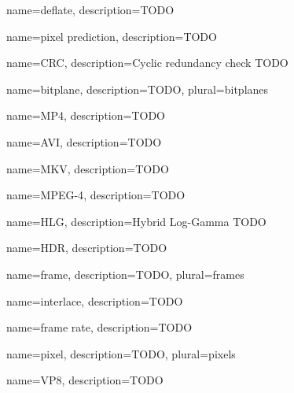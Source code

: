 {
	name={deflate},
	description={TODO}
}

{
	name={pixel prediction},
	description={TODO}
}

{
	name={CRC},
	description={Cyclic redundancy check TODO}
}

{
	name={bitplane},
	description={TODO},
	plural={bitplanes}
}

{
	name={MP4},
	description={TODO}
}

{
	name={AVI},
	description={TODO}
}

{
	name={MKV},
	description={TODO}
}

{
	name={MPEG-4},
	description={TODO}
}

{
	name={HLG},
	description={Hybrid Log-Gamma TODO}
}

{
	name={HDR},
	description={TODO}
}

{
	name={frame},
	description={TODO},
	plural={frames}
}

{
	name={interlace},
	description={TODO}
}

{
	name={frame rate},
	description={TODO}
}

{
	name={pixel},
	description={TODO},
	plural={pixels}
}

{
	name={VP8},
	description={TODO}
}